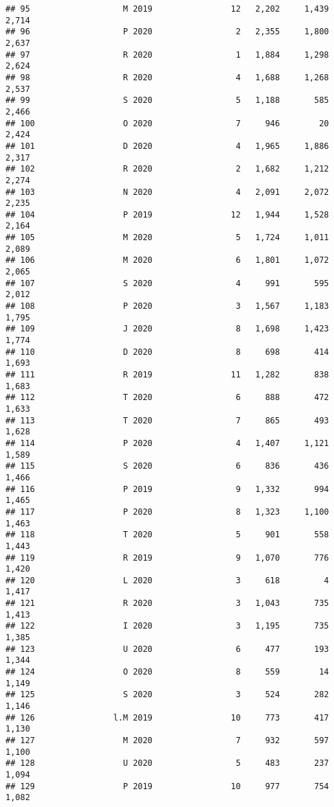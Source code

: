 \documentclass[
]{article}
\begin{document}
\begin{verbatim}
## 95                   M 2019                12   2,202     1,439    2,714
## 96                   P 2020                 2   2,355     1,800    2,637
## 97                   R 2020                 1   1,884     1,298    2,624
## 98                   R 2020                 4   1,688     1,268    2,537
## 99                   S 2020                 5   1,188       585    2,466
## 100                  O 2020                 7     946        20    2,424
## 101                  D 2020                 4   1,965     1,886    2,317
## 102                  R 2020                 2   1,682     1,212    2,274
## 103                  N 2020                 4   2,091     2,072    2,235
## 104                  P 2019                12   1,944     1,528    2,164
## 105                  M 2020                 5   1,724     1,011    2,089
## 106                  M 2020                 6   1,801     1,072    2,065
## 107                  S 2020                 4     991       595    2,012
## 108                  P 2020                 3   1,567     1,183    1,795
## 109                  J 2020                 8   1,698     1,423    1,774
## 110                  D 2020                 8     698       414    1,693
## 111                  R 2019                11   1,282       838    1,683
## 112                  T 2020                 6     888       472    1,633
## 113                  T 2020                 7     865       493    1,628
## 114                  P 2020                 4   1,407     1,121    1,589
## 115                  S 2020                 6     836       436    1,466
## 116                  P 2019                 9   1,332       994    1,465
## 117                  P 2020                 8   1,323     1,100    1,463
## 118                  T 2020                 5     901       558    1,443
## 119                  R 2019                 9   1,070       776    1,420
## 120                  L 2020                 3     618         4    1,417
## 121                  R 2020                 3   1,043       735    1,413
## 122                  I 2020                 3   1,195       735    1,385
## 123                  U 2020                 6     477       193    1,344
## 124                  O 2020                 8     559        14    1,149
## 125                  S 2020                 3     524       282    1,146
## 126                l.M 2019                10     773       417    1,130
## 127                  M 2020                 7     932       597    1,100
## 128                  U 2020                 5     483       237    1,094
## 129                  P 2019                10     977       754    1,082

\end{verbatim}
\end{document}
